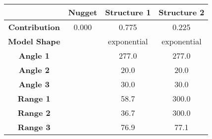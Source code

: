 \begin{tabular}{cccc}
\toprule
{} & Nugget &  Structure 1 &  Structure 2 \\
\midrule
\textbf{Contribution} &  0.000 &        0.775 &        0.225 \\
\textbf{Model Shape } &        &  exponential &  exponential \\
\textbf{Angle 1     } &        &        277.0 &        277.0 \\
\textbf{Angle 2     } &        &         20.0 &         20.0 \\
\textbf{Angle 3     } &        &         30.0 &         30.0 \\
\textbf{Range 1     } &        &         58.7 &        300.0 \\
\textbf{Range 2     } &        &         36.7 &        300.0 \\
\textbf{Range 3     } &        &         76.9 &         77.1 \\
\bottomrule
\end{tabular}
